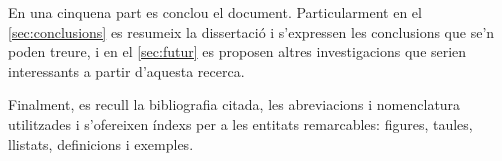 En una cinquena part es conclou el document. Particularment en el
\autoref{sec:conclusions} es resumeix la dissertació i s'expressen les
conclusions que se'n poden treure, i en el \autoref{sec:futur} es
proposen altres investigacions que serien interessants a partir
d'aquesta recerca.




Finalment, es recull la bibliografia citada, les abreviacions i
nomenclatura utilitzades i s'ofereixen índexs per a les entitats
remarcables: figures, taules, llistats, definicions i exemples.






















